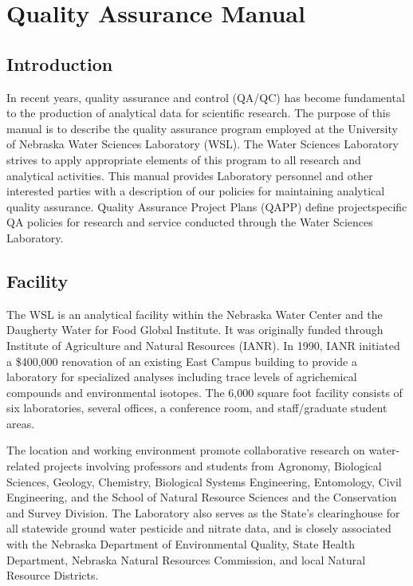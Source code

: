 \chapter{Quality Assurance Manual}
\section{Introduction}
In recent years, quality assurance and control (QA/QC) has become 
fundamental to the production of analytical data for scientific 
research. The purpose of this manual is to describe the quality 
assurance program employed at the University of Nebraska Water Sciences 
Laboratory (WSL). The Water Sciences Laboratory strives to apply 
appropriate elements of this program to all research and analytical 
activities. This manual provides Laboratory personnel and other 
interested parties with a description of our policies for maintaining 
analytical quality assurance. Quality Assurance Project Plans (QAPP) 
define projectspecific QA policies for research and service conducted 
through the Water Sciences Laboratory.



\section{Facility}
The WSL is an analytical facility within the Nebraska Water Center and the Daugherty Water for Food Global Institute. 
It was originally funded through Institute of Agriculture and Natural Resources (IANR). In 1990, IANR initiated a \$400,000 renovation of an existing East Campus building to provide a laboratory for specialized analyses 
including trace levels of agrichemical compounds and environmental 
isotopes. The 6,000 square foot facility consists of six laboratories, 
several offices, a conference room, and staff/graduate student areas. 

The location and working environment promote collaborative research on 
water-related projects involving professors and students from Agronomy, 
Biological Sciences, Geology, Chemistry, Biological Systems Engineering, 
Entomology, Civil Engineering, and the School of Natural Resource 
Sciences and the Conservation and Survey Division. The Laboratory also 
serves as the State's clearinghouse for all statewide ground water 
pesticide and nitrate data, and is closely associated with the Nebraska 
Department of Environmental Quality, State Health Department, Nebraska 
Natural Resources Commission, and local Natural Resource Districts.




